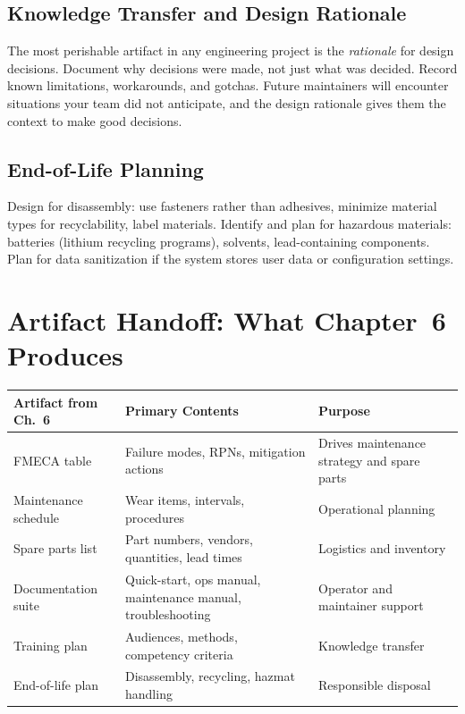 \documentclass[11pt,letterpaper,twoside,openany]{book}
\begin{document}
\subsection{Knowledge Transfer and Design Rationale}
The most perishable artifact in any engineering project is the \emph{rationale} for design decisions. Document why decisions were made, not just what was decided. Record known limitations, workarounds, and gotchas. Future maintainers will encounter situations your team did not anticipate, and the design rationale gives them the context to make good decisions.

\subsection{End-of-Life Planning}
Design for disassembly: use fasteners rather than adhesives, minimize material types for recyclability, label materials. Identify and plan for hazardous materials: batteries (lithium recycling programs), solvents, lead-containing components. Plan for data sanitization if the system stores user data or configuration settings.

\FloatBarrier
\section{Artifact Handoff: What Chapter~6 Produces}

\begin{center}
\small
\begin{tabularx}{\textwidth}{l X X}
\toprule
\textbf{Artifact from Ch.~6} & \textbf{Primary Contents} & \textbf{Purpose} \\
\midrule
FMECA table & Failure modes, RPNs, mitigation actions & Drives maintenance strategy and spare parts \\
Maintenance schedule & Wear items, intervals, procedures & Operational planning \\
Spare parts list & Part numbers, vendors, quantities, lead times & Logistics and inventory \\
Documentation suite & Quick-start, ops manual, maintenance manual, troubleshooting & Operator and maintainer support \\
Training plan & Audiences, methods, competency criteria & Knowledge transfer \\
End-of-life plan & Disassembly, recycling, hazmat handling & Responsible disposal \\
\bottomrule
\end{tabularx}
\end{center}
\end{document}
